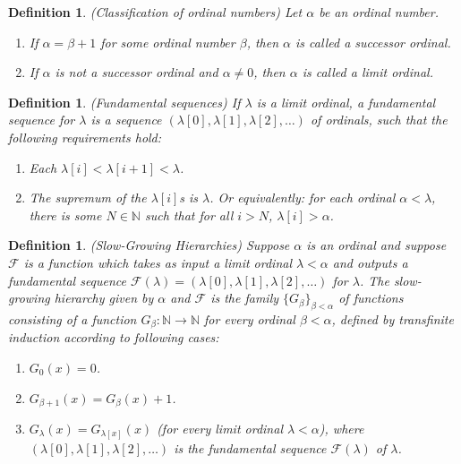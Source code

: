 \documentclass{article}
\newtheorem{definition}[theorem]{Definition}
\begin{document}
\begin{definition}
    (Classification of ordinal numbers)
    Let $\alpha$ be an ordinal number.
    \begin{enumerate}
        \item
        If $\alpha=\beta+1$ for some ordinal number $\beta$, then $\alpha$ is called
        a \emph{successor ordinal}.
        \item
        If $\alpha$ is not a successor ordinal and $\alpha\neq 0$, then $\alpha$ is
        called a \emph{limit ordinal}.
    \end{enumerate}
\end{definition}

\begin{definition}
\label{fundamentalsequencedefn}
    (Fundamental sequences)
    If $\lambda$ is a limit ordinal, a \emph{fundamental sequence} for $\lambda$
    is a sequence $(\lambda[0],\lambda[1],\lambda[2],\ldots)$
    of ordinals, such that the following requirements hold:
    \begin{enumerate}
        \item
        Each $\lambda[i]<\lambda[i+1]<\lambda$.
        \item
        The supremum of the $\lambda[i]$s is $\lambda$. Or equivalently:
        for each ordinal $\alpha<\lambda$, there is some $N\in\mathbb N$ such that
        for all $i>N$, $\lambda[i]>\alpha$.
    \end{enumerate}
\end{definition}

\begin{definition}
\label{slowgrowinghierarchiesdefn}
    (Slow-Growing Hierarchies)
    Suppose $\alpha$ is an ordinal and suppose $\mathcal F$ is a function which
    takes as input a limit ordinal $\lambda<\alpha$ and outputs a fundamental
    sequence $\mathcal F(\lambda)=(\lambda[0],\lambda[1],\lambda[2],\ldots)$
    for $\lambda$. The \emph{slow-growing hierarchy given by $\alpha$ and $\mathcal F$}
    is the family $\{G_\beta\}_{\beta<\alpha}$ of functions consisting of a function
    $G_\beta:\mathbb N\to\mathbb N$ for every
    ordinal $\beta<\alpha$, defined by transfinite induction according to following cases:
    \begin{enumerate}
        \item
        $G_0(x)=0$.
        \item
        $G_{\beta+1}(x) = G_\beta(x) + 1$.
        \item
        $G_{\lambda}(x) = G_{\lambda[x]}(x)$ (for every limit ordinal $\lambda<\alpha$),
        where $(\lambda[0],\lambda[1],\lambda[2],\ldots)$ is the fundamental sequence
        $\mathcal F(\lambda)$ of $\lambda$.
    \end{enumerate}
\end{definition}
\end{document}

